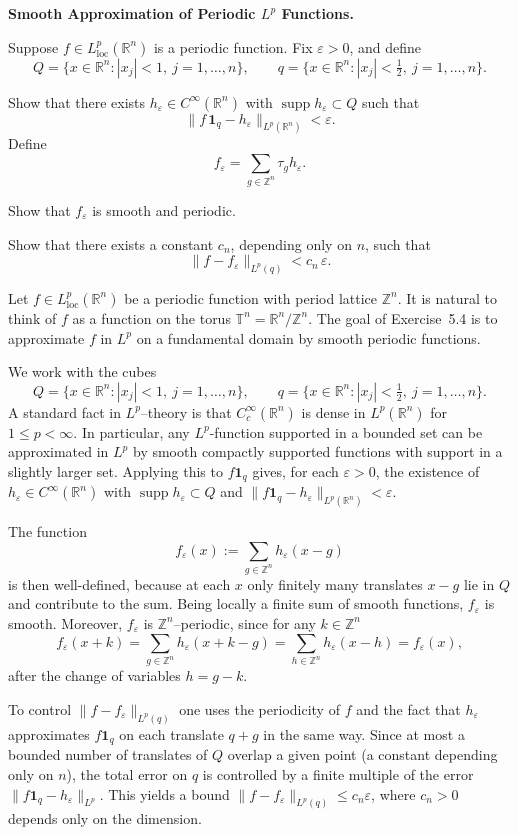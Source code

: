 \begin{problem}[CP-II-0029]
\label{prob:cp-ii-0029}
\textbf{Smooth Approximation of Periodic \(L^p\) Functions.}

\hspace*{1.5em}Suppose $f \in L^p_{\mathrm{loc}}(\mathbb{R}^n)$ is a periodic function.
Fix $\varepsilon>0$, and define
\[
Q = \{x\in\mathbb{R}^n : |x_j| < 1,\ j=1,\dots,n\},
\qquad
q = \{x\in\mathbb{R}^n : |x_j| < \tfrac12,\ j=1,\dots,n\}.
\]

Show that there exists $h_\varepsilon \in C^\infty(\mathbb{R}^n)$ with
$\operatorname{supp} h_\varepsilon \subset Q$ such that
\[
\|f\,\mathbf{1}_q - h_\varepsilon\|_{L^p(\mathbb{R}^n)} < \varepsilon.
\]
Define
\[
f_\varepsilon = \sum_{g\in\mathbb{Z}^n} \tau_g h_\varepsilon.
\]

Show that $f_\varepsilon$ is smooth and periodic.

Show that there exists a constant $c_n$, depending only on $n$, such that
\[
\|f - f_\varepsilon\|_{L^p(q)} < c_n\,\varepsilon.
\]

Let $f\in L^p_{\mathrm{loc}}(\mathbb{R}^n)$ be a periodic function with
period lattice $\mathbb{Z}^n$.  It is natural to think of $f$ as a
function on the torus $\mathbb{T}^n=\mathbb{R}^n/\mathbb{Z}^n$.  The
goal of Exercise~5.4 is to approximate $f$ in $L^p$ on a fundamental
domain by smooth periodic functions.

We work with the cubes
\[
Q = \{x\in\mathbb{R}^n : |x_j|<1,\ j=1,\dots,n\},
\qquad
q = \{x\in\mathbb{R}^n : |x_j|<\tfrac12,\ j=1,\dots,n\}.
\]
A standard fact in $L^p$--theory is that $C_c^\infty(\mathbb{R}^n)$ is
dense in $L^p(\mathbb{R}^n)$ for $1\le p<\infty$.  In particular, any
$L^p$-function supported in a bounded set can be approximated in $L^p$
by smooth compactly supported functions with support in a slightly
larger set.  Applying this to $f\mathbf{1}_q$ gives, for each
$\varepsilon>0$, the existence of $h_\varepsilon\in C^\infty(\mathbb{R}^n)$
with $\operatorname{supp}h_\varepsilon\subset Q$ and
$\|f\mathbf{1}_q-h_\varepsilon\|_{L^p(\mathbb{R}^n)}<\varepsilon$.

The function
\[
f_\varepsilon(x) := \sum_{g\in\mathbb{Z}^n} h_\varepsilon(x-g)
\]
is then well-defined, because at each $x$ only finitely many translates
$x-g$ lie in $Q$ and contribute to the sum.  Being locally a finite sum
of smooth functions, $f_\varepsilon$ is smooth.  Moreover,
$f_\varepsilon$ is $\mathbb{Z}^n$--periodic, since for any $k\in\mathbb{Z}^n$
\[
f_\varepsilon(x+k)
= \sum_{g\in\mathbb{Z}^n} h_\varepsilon(x+k-g)
= \sum_{h\in\mathbb{Z}^n} h_\varepsilon(x-h)
= f_\varepsilon(x),
\]
after the change of variables $h=g-k$.

To control $\|f-f_\varepsilon\|_{L^p(q)}$ one uses the periodicity of $f$
and the fact that $h_\varepsilon$ approximates $f\mathbf{1}_q$ on each
translate $q+g$ in the same way.  Since at most a bounded number of
translates of $Q$ overlap a given point (a constant depending only on
$n$), the total error on $q$ is controlled by a finite multiple of the
error $\|f\mathbf{1}_q-h_\varepsilon\|_{L^p}$.  This yields a bound
$\|f - f_\varepsilon\|_{L^p(q)} \le c_n\varepsilon$, where $c_n>0$
depends only on the dimension.
\end{problem}

